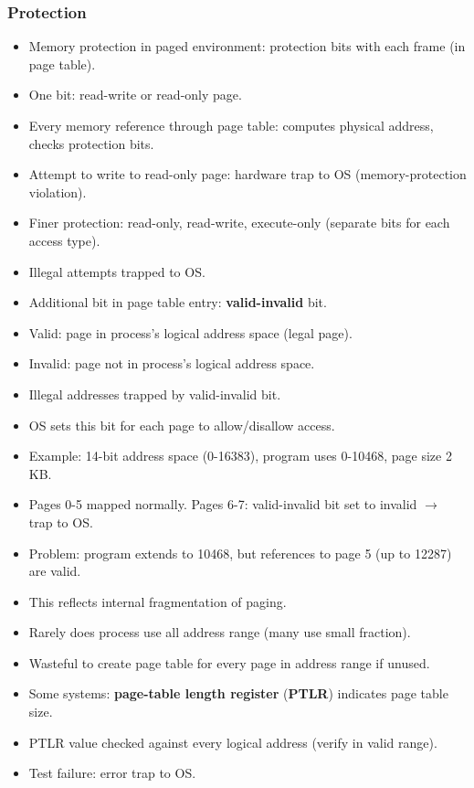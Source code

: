 \subsubsection*{Protection}
\begin{itemize}
    \item Memory protection in paged environment: protection bits with each frame (in page table).
    \item One bit: read-write or read-only page.
    \item Every memory reference through page table: computes physical address, checks protection bits.
    \item Attempt to write to read-only page: hardware trap to OS (memory-protection violation).
    \item Finer protection: read-only, read-write, execute-only (separate bits for each access type).
    \item Illegal attempts trapped to OS.
    \item Additional bit in page table entry: \textbf{valid-invalid} bit.
    \item Valid: page in process's logical address space (legal page).
    \item Invalid: page not in process's logical address space.
    \item Illegal addresses trapped by valid-invalid bit.
    \item OS sets this bit for each page to allow/disallow access.
    \item Example: 14-bit address space (0-16383), program uses 0-10468, page size 2 KB.
    \item Pages 0-5 mapped normally. Pages 6-7: valid-invalid bit set to invalid $\rightarrow$ trap to OS.
    \item Problem: program extends to 10468, but references to page 5 (up to 12287) are valid.
    \item This reflects internal fragmentation of paging.
    \item Rarely does process use all address range (many use small fraction).
    \item Wasteful to create page table for every page in address range if unused.
    \item Some systems: \textbf{page-table length register} (\textbf{PTLR}) indicates page table size.
    \item PTLR value checked against every logical address (verify in valid range).
    \item Test failure: error trap to OS.
\end{itemize}

